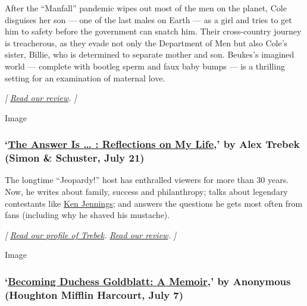 After the ``Manfall'' pandemic wipes out most of the men on the planet,
Cole disguises her son --- one of the last males on Earth --- as a girl
and tries to get him to safety before the government can snatch him.
Their cross-country journey is treacherous, as they evade not only the
Department of Men but also Cole's sister, Billie, who is determined to
separate mother and son. Beukes's imagined world --- complete with
bootleg sperm and faux baby bumps --- is a thrilling setting for an
examination of maternal love.

\emph{{[}}
\href{https://www.nytimes3xbfgragh.onion/2020/07/24/books/review/lauren-beukes-afterland.html}{\emph{Read
our review}}\emph{. {]}}

Image

\hypertarget{the-answer-is---reflections-on-my-life-by-alex-trebek-simon--schuster-july-21}{%
\subsubsection{\texorpdfstring{`\href{https://www.simonandschuster.com/books/The-Answer-Is/Alex-Trebek/9781982157999}{The
Answer Is \ldots{} : Reflections on My Life},' by Alex Trebek (Simon \&
Schuster, July
21)}{`The Answer Is \ldots{} : Reflections on My Life,' by Alex Trebek (Simon \& Schuster, July 21)}}\label{the-answer-is---reflections-on-my-life-by-alex-trebek-simon--schuster-july-21}}

The longtime ``Jeopardy!'' host has enthralled viewers for more than 30
years. Now, he writes about family, success and philanthropy; talks
about legendary contestants like
\href{https://www.nytimes3xbfgragh.onion/2020/01/14/arts/television/jeopardy-goat-ken-jennings.html}{Ken
Jennings}; and answers the questions he gets most often from fans
(including why he shaved his mustache).

\emph{{[}}
\href{https://www.nytimes3xbfgragh.onion/2020/07/17/books/alex-trebek-jeopardy-the-answer-is.html}{\emph{Read
our profile of Trebek}}\emph{. \textbar{}}
\href{https://www.nytimes3xbfgragh.onion/2020/07/21/books/review-answer-is-alex-trebek-jeopardy-memoir.html}{\emph{Read
our review}}\emph{. {]}}

Image

\hypertarget{becoming-duchess-goldblatt-a-memoir-by-anonymous-houghton-mifflin-harcourt-july-7}{%
\subsubsection{\texorpdfstring{`\href{https://www.hmhbooks.com/shop/books/Becoming-Duchess-Goldblatt/9780358216773}{Becoming
Duchess Goldblatt: A Memoir},' by Anonymous (Houghton Mifflin Harcourt,
July
7)}{`Becoming Duchess Goldblatt: A Memoir,' by Anonymous (Houghton Mifflin Harcourt, July 7)}}\label{becoming-duchess-goldblatt-a-memoir-by-anonymous-houghton-mifflin-harcourt-july-7}}

